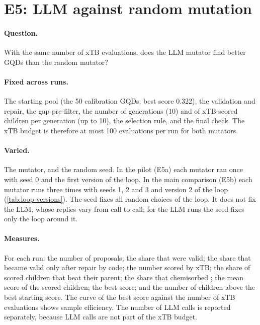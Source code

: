 \section{E5: LLM against random mutation}
\label{sec:e5}

\paragraph{Question.} With the same number of xTB evaluations, does the LLM mutator find better
GQDs than the random mutator?

\paragraph{Fixed across runs.} The starting pool (the 50 calibration GQDs; best score 0.322), the
validation and repair, the gap pre-filter, the number of generations (10) and of xTB-scored
children per generation (up to 10), the selection rule, and the final check. The xTB budget is
therefore at most 100 evaluations per run for both mutators.

\paragraph{Varied.} The mutator, and the random seed. In the pilot (E5a) each mutator ran once
with seed 0 and the first version of the loop. In the main comparison (E5b) each mutator runs three
times with seeds 1, 2 and 3 and version 2 of the loop (\cref{tab:loop-versions}). The seed fixes
all random choices of the loop. It does not fix the LLM, whose replies vary from call to call; for
the LLM runs the seed fixes only the loop around it.

\paragraph{Measures.} For each run: the number of proposals; the share that were valid; the share
that became valid only after repair by code; the number scored by xTB; the share of scored children
that beat their parent; the share that chemisorbed ; the mean score of the scored children;
the best score; and the number of children above the best starting score. The curve of the best
score against the number of xTB evaluations shows sample efficiency. The number of LLM calls is
reported separately, because LLM calls are not part of the xTB budget.

